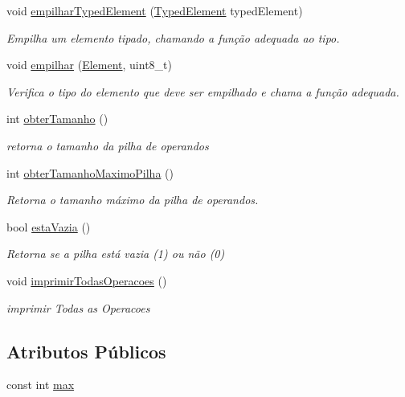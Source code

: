 \begin{DoxyCompactItemize}
void \hyperlink{classOperandsStack_a73960b4536c99847bf4545a45f04f089}{empilhar\+Typed\+Element} (\hyperlink{BasicTypes_8h_a97b332303b1262282599e6ede0637b82}{Typed\+Element} typed\+Element)
\begin{DoxyCompactList}\small\item\em Empilha um elemento tipado, chamando a função adequada ao tipo. \end{DoxyCompactList}\item 
void \hyperlink{classOperandsStack_a50b642d5ff6a7a1f56b8cfc75bde1192}{empilhar} (\hyperlink{BasicTypes_8h_a8132f4f0515064141e31e606660df561}{Element}, uint8\+\_\+t)
\begin{DoxyCompactList}\small\item\em Verifica o tipo do elemento que deve ser empilhado e chama a função adequada. \end{DoxyCompactList}\item 
int \hyperlink{classOperandsStack_a6ea316fc2b2503af2175fada4d4a9741}{obter\+Tamanho} ()
\begin{DoxyCompactList}\small\item\em retorna o tamanho da pilha de operandos \end{DoxyCompactList}\item 
int \hyperlink{classOperandsStack_a834d4e49d01388abf37582f95d66b40e}{obter\+Tamanho\+Maximo\+Pilha} ()
\begin{DoxyCompactList}\small\item\em Retorna o tamanho máximo da pilha de operandos. \end{DoxyCompactList}\item 
bool \hyperlink{classOperandsStack_aa6dbee87661011453ba2c57405bd9a4e}{esta\+Vazia} ()
\begin{DoxyCompactList}\small\item\em Retorna se a pilha está vazia (1) ou não (0) \end{DoxyCompactList}\item 
void \hyperlink{classOperandsStack_a21ecd56a74034dbd8ed6925924cf30e6}{imprimir\+Todas\+Operacoes} ()
\begin{DoxyCompactList}\small\item\em imprimir Todas as Operacoes \end{DoxyCompactList}\end{DoxyCompactItemize}
\subsection*{Atributos Públicos}
\begin{DoxyCompactItemize}
\item 
const int \hyperlink{classOperandsStack_ac17a81af6a26d029042e6c7ad598a538}{max}
\end{DoxyCompactItemize}
